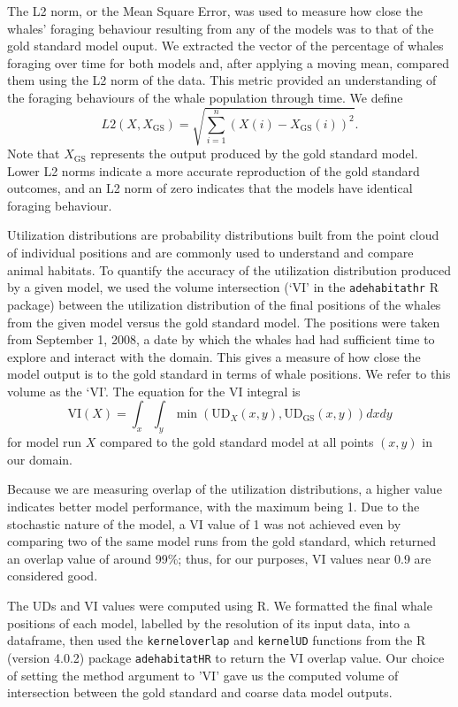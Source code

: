 \documentclass[11pt]{article}
\begin{document}
The L2 norm, or the Mean Square Error, was used to measure how close the whales’ foraging behaviour resulting from any of the models was to that of the gold standard model ouput. We extracted the vector of the percentage of whales foraging over time for both models and, after applying a moving mean, compared them using the L2 norm of the data. This metric provided an understanding of the foraging behaviours of the whale population through time. We define
\begin{equation}
    L2(X,X_{\text{GS}}) = \sqrt{\sum_{i=1}^n (X(i) - X_{\text{GS}}(i))^2}.
\end{equation}
Note that $X_{\text{GS}}$ represents the output produced by the gold standard model. Lower L2 norms indicate a more accurate reproduction of the gold standard outcomes, and an L2 norm of zero indicates that the models have identical foraging behaviour.  \par

Utilization distributions are probability distributions built from the point cloud of individual positions and are commonly used to understand and compare animal habitats. To quantify the accuracy of the utilization distribution produced by a given model, we used the volume intersection (‘VI’ in the \texttt{adehabitathr} R package) between the utilization distribution of the final positions of the whales from the given model versus the gold standard model. The positions were taken from September 1, 2008, a date by which the whales had had sufficient time to explore and interact with the domain. This gives a measure of how close the model output is to the gold standard in terms of whale positions. We refer to this volume as the ‘VI’. The equation for the VI integral is
\begin{equation}\text{VI}(X) = \int_x\int_y \min(\text{UD}_{X}(x,y),\text{UD}_{\text{GS}}(x,y)) dxdy \end{equation}
for model run $X$ compared to the gold standard model at all points $(x,y)$ in our domain. 

Because we are measuring overlap of the utilization distributions, a higher value indicates better model performance, with the maximum being 1. Due to the stochastic nature of the model, a VI value of 1 was not achieved even by comparing two of the same model runs from the gold standard, which returned an overlap value of around 99\%; thus, for our purposes, VI values near 0.9 are considered good. \par 
The UDs and VI values were computed using R. We formatted the final whale positions of each model, labelled by the resolution of its input data, into a dataframe, then used the \texttt{kerneloverlap} and \texttt{kernelUD} functions from the {R} (version 4.0.2) package \texttt{adehabitatHR} \cite{Rpackage} to return the VI overlap value. Our choice of setting the method argument to 'VI' gave us the computed volume of intersection between the gold standard and coarse data model outputs. \par
\end{document}
